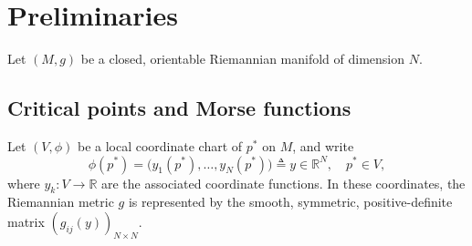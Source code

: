 \documentclass[12pt,reqno]{amsart}
\numberwithin{equation}{section}
\begin{document}




\section{Preliminaries}\label{pre}

Let \((M,g)\) be a closed, orientable Riemannian manifold of dimension $N$.

\subsection{Critical points and Morse functions}
Let $(V,\phi)$ be a local coordinate chart of $p^*$ on $M$, and write  
\[
\phi(p^*)=\bigl(y_{1}(p^*),\dots,y_{N}(p^*)\bigr)\triangleq y\in\mathbb{R}^{N},\quad p^*\in V,
\]
where \(y_{k}:V\to\mathbb{R}\) are the associated coordinate functions.
In these coordinates, the Riemannian metric $g$ is represented by the smooth,
symmetric, positive-definite matrix
 \((g_{ij}(y))_{N\times N}\).
\end{document}
